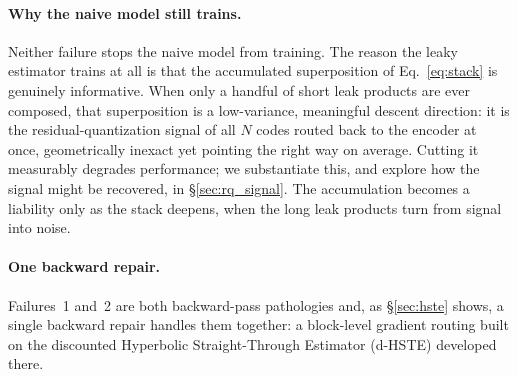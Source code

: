\documentclass[12pt]{report}
\begin{document}
\paragraph{Why the naive model still trains.}
Neither failure stops the naive model from training. The reason the leaky estimator trains at all is that the accumulated superposition of Eq.~\ref{eq:stack} is genuinely informative. When only a handful of short leak products are ever composed, that superposition is a low-variance, meaningful descent direction: it is the residual-quantization signal of all $N$ codes routed back to the encoder at once, geometrically inexact yet pointing the right way on average. Cutting it measurably degrades performance; we substantiate this, and explore how the signal might be recovered, in \S\ref{sec:rq_signal}. The accumulation becomes a liability only as the stack deepens, when the long leak products turn from signal into noise.

\paragraph{One backward repair.} Failures~1 and~2 are both backward-pass pathologies and, as \S\ref{sec:hste} shows, a single backward repair handles them together: a block-level gradient routing built on the discounted Hyperbolic Straight-Through Estimator (d-HSTE) developed there.
\end{document}
